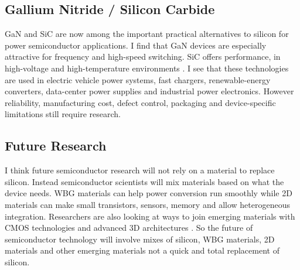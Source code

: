 \subsection{Gallium Nitride / Silicon Carbide}
GaN and SiC are now among the important practical alternatives to silicon for power semiconductor applications. 
I find that GaN devices are especially attractive for frequency and high-speed switching. SiC offers performance, 
in high-voltage and high-temperature environments \cite{paper_013}. I see that these technologies are used in electric 
vehicle power systems, fast chargers, renewable-energy converters, data-center power supplies and industrial 
power electronics. However reliability, manufacturing cost, defect control, packaging and device-specific 
limitations still require research.

\subsection{Future Research}
I think future semiconductor research will not rely on a material to replace silicon. Instead semiconductor 
scientists will mix materials based on what the device needs. WBG materials can help power conversion run 
smoothly while 2D materials can make small transistors, sensors, memory and allow heterogeneous integration. 
Researchers are also looking at ways to join emerging materials with CMOS technologies and advanced 
3D architectures \cite{paper_015}. So the future of semiconductor technology will involve mixes of silicon, 
WBG materials, 2D materials and other emerging materials not a quick and total replacement of silicon.